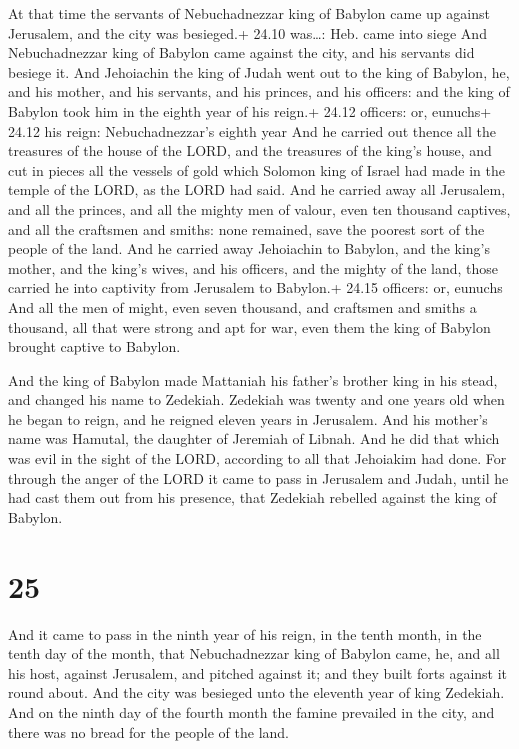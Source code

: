  At that time the servants of Nebuchadnezzar king of
Babylon came up against Jerusalem, and the city was besieged.+ 24.10
was\ldots: Heb. came into siege  And Nebuchadnezzar king of
Babylon came against the city, and his servants did besiege it.
 And Jehoiachin the king of Judah went out to the king of
Babylon, he, and his mother, and his servants, and his princes, and his
officers: and the king of Babylon took him in the eighth year of his
reign.+ 24.12 officers: or, eunuchs+ 24.12 his reign: Nebuchadnezzar's
eighth year  And he carried out thence all the treasures of
the house of the LORD, and the treasures of the king's house, and cut in
pieces all the vessels of gold which Solomon king of Israel had made in
the temple of the LORD, as the LORD had said.  And he
carried away all Jerusalem, and all the princes, and all the mighty men
of valour, even ten thousand captives, and all the craftsmen and smiths:
none remained, save the poorest sort of the people of the land.
 And he carried away Jehoiachin to Babylon, and the king's
mother, and the king's wives, and his officers, and the mighty of the
land, those carried he into captivity from Jerusalem to Babylon.+ 24.15
officers: or, eunuchs  And all the men of might, even seven
thousand, and craftsmen and smiths a thousand, all that were strong and
apt for war, even them the king of Babylon brought captive to Babylon.

 And the king of Babylon made Mattaniah his father's
brother king in his stead, and changed his name to Zedekiah.
 Zedekiah was twenty and one years old when he began to
reign, and he reigned eleven years in Jerusalem. And his mother's name
was Hamutal, the daughter of Jeremiah of Libnah.  And he
did that which was evil in the sight of the LORD, according to all that
Jehoiakim had done.  For through the anger of the LORD it
came to pass in Jerusalem and Judah, until he had cast them out from his
presence, that Zedekiah rebelled against the king of Babylon.

\hypertarget{section-24}{%
\section{25}\label{section-24}}

 And it came to pass in the ninth year of his reign, in the
tenth month, in the tenth day of the month, that Nebuchadnezzar king of
Babylon came, he, and all his host, against Jerusalem, and pitched
against it; and they built forts against it round about. 
And the city was besieged unto the eleventh year of king Zedekiah.
 And on the ninth day of the fourth month the famine
prevailed in the city, and there was no bread for the people of the
land.

